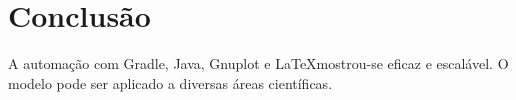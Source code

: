 \chapter{Conclusão}
A automação com Gradle, Java, Gnuplot e \LaTeX mostrou-se eficaz e escalável. O modelo pode ser aplicado a diversas áreas científicas.

